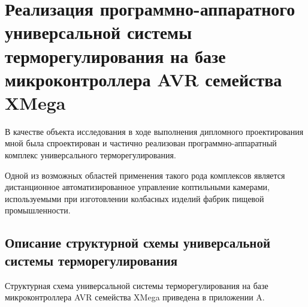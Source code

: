 \section{Реализация программно-аппаратного универсальной
системы терморегулирования на базе микроконтроллера AVR семейства XMega}
В качестве объекта исследования в ходе выполнения дипломного проектирования мной
была спроектирован и частично реализован программно-аппаратный комплекс
универсального терморегулирования.

Одной из возможных областей применения такого рода комплексов является дистанционное
автоматизированное управление коптильными камерами, используемыми при изготовлении
колбасных изделий фабрик пищевой промышленности.

\subsection{Описание структурной схемы универсальной системы терморегулирования}
Структурная схема универсальной системы терморегулирования на базе микроконтроллера
AVR семейства XMega приведена в приложении A.

